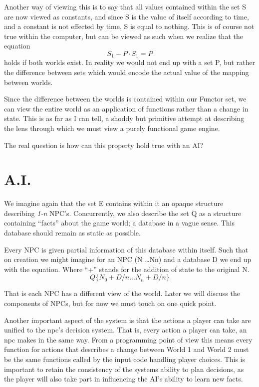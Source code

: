 \documentclass[11pt,twocolumn]{article}
\begin{document}
Another way of viewing this is to say that all values contained within the set S are now viewed as constants, and since S is the value of itself according to time, and a constant is not effected by time,  S is equal to nothing.  This is of course not true within the computer,  but can be viewed as such when we realize that the equation
\begin{displaymath}S_1 - P \cdot S_1 = P\end{displaymath} holds if both worlds exist.  In reality we would not end up with a set P, but rather the difference between sets which would encode the actual value of the mapping between worlds.

Since the difference between the worlds is contained within our Functor set,  we can view the entire world as an application of functions rather than a change in state.  This is as far as I can tell, a shoddy but primitive attempt at describing the lens through which we must view a purely functional game engine.

The real question is how can this property hold true with an AI?
\section{A.I.}
We imagine again that the set E contains within it an opaque structure describing \textit{1-n } NPC's.  Concurrently, we also describe the set Q as a structure containing ``facts'' about the game world;  a database in a vague sense.  This database should remain as static as possible.

Every NPC is given partial information of this database within itself.  Such that on creation we might imagine for an NPC (N \dots Nn) and a database D we end up with the equation.  Where ``+'' stands for the addition of state to the original N.
\begin{displaymath}Q\{N_0 + D/n ... N_n + D/n\}\end{displaymath}

That is each NPC has a different view of the world.  Later we will discuss the components of NPCs,  but for now we must touch on one quick point.

Another important aspect of the system is that the actions a player can take are unified to the npc's decision system.  That is,  every action a player can take, an npc makes in the same way.  From a programming point of view this means every function for actions that describes a change between World 1 and World 2 must be the same functions called by the input code handling player choices.  This is important to retain the consistency of the systems ability to plan decisions, as the player will also take part in influencing the AI's ability to learn new facts.
\end{document}
